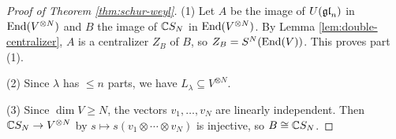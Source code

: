 \begin{proof}[Proof of Theorem \ref{thm:schur-weyl}]
  (1) Let $A$ be the image of
  $U(\mathfrak{gl}_n)$ in $\operatorname{End}(V^{\otimes N})$
  and $B$ the image of
  $\mathbb{C} S_N$ in $\operatorname{End}(V^{\otimes N})$.
  By Lemma \ref{lem:double-centralizer},
  $A$ is a centralizer $Z_B$ of $B$,
  so $Z_B = S^N(\operatorname{End}(V))$. This proves
  part (1).

  (2) Since $\lambda$ has $\le n$
  parts, we have $L_\lambda \subseteq V^{\otimes N}$.

  (3) Since $\dim V \ge N$,
  the vectors $v_1, \dots, v_N$ are
  linearly independent. Then
  $\mathbb{C} S_N \to V^{\otimes N}$
  by $s \mapsto s(v_1 \otimes \cdots \otimes v_N)$
  is injective, so $B \cong \mathbb{C} S_N$.
\end{proof}
